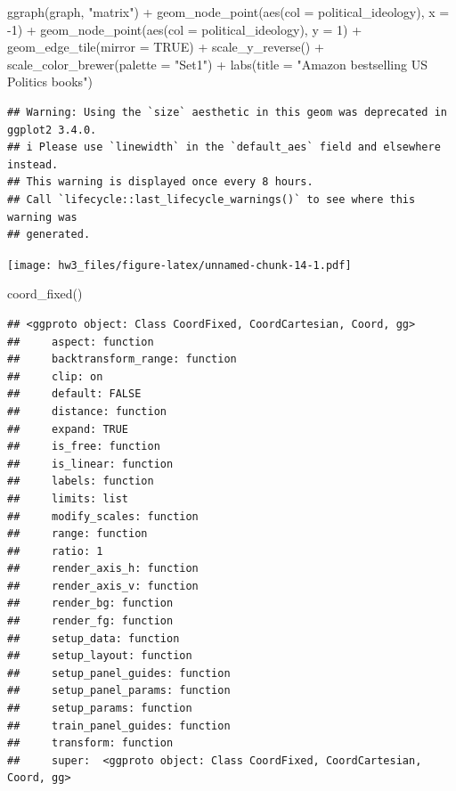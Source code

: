 \documentclass[
]{article}
\newenvironment{Shaded}{\begin{snugshade}}{\end{snugshade}}
\newcommand{\AttributeTok}[1]{\textcolor[rgb]{0.77,0.63,0.00}{#1}}
\newcommand{\ConstantTok}[1]{\textcolor[rgb]{0.00,0.00,0.00}{#1}}
\newcommand{\DecValTok}[1]{\textcolor[rgb]{0.00,0.00,0.81}{#1}}
\newcommand{\FunctionTok}[1]{\textcolor[rgb]{0.00,0.00,0.00}{#1}}
\newcommand{\NormalTok}[1]{#1}
\newcommand{\SpecialCharTok}[1]{\textcolor[rgb]{0.00,0.00,0.00}{#1}}
\newcommand{\StringTok}[1]{\textcolor[rgb]{0.31,0.60,0.02}{#1}}
\begin{document}
\begin{Shaded}
\begin{Highlighting}[]
\FunctionTok{ggraph}\NormalTok{(graph, }\StringTok{"matrix"}\NormalTok{) }\SpecialCharTok{+}
  \FunctionTok{geom\_node\_point}\NormalTok{(}\FunctionTok{aes}\NormalTok{(}\AttributeTok{col =}\NormalTok{ political\_ideology), }\AttributeTok{x =} \SpecialCharTok{{-}}\DecValTok{1}\NormalTok{) }\SpecialCharTok{+}
  \FunctionTok{geom\_node\_point}\NormalTok{(}\FunctionTok{aes}\NormalTok{(}\AttributeTok{col =}\NormalTok{ political\_ideology), }\AttributeTok{y =} \DecValTok{1}\NormalTok{) }\SpecialCharTok{+}
  \FunctionTok{geom\_edge\_tile}\NormalTok{(}\AttributeTok{mirror =} \ConstantTok{TRUE}\NormalTok{) }\SpecialCharTok{+}
  \FunctionTok{scale\_y\_reverse}\NormalTok{() }\SpecialCharTok{+}
  \FunctionTok{scale\_color\_brewer}\NormalTok{(}\AttributeTok{palette =} \StringTok{"Set1"}\NormalTok{) }\SpecialCharTok{+}
  \FunctionTok{labs}\NormalTok{(}\AttributeTok{title =} \StringTok{"Amazon bestselling US Politics books"}\NormalTok{)}
\end{Highlighting}
\end{Shaded}

\begin{verbatim}
## Warning: Using the `size` aesthetic in this geom was deprecated in ggplot2 3.4.0.
## i Please use `linewidth` in the `default_aes` field and elsewhere instead.
## This warning is displayed once every 8 hours.
## Call `lifecycle::last_lifecycle_warnings()` to see where this warning was
## generated.
\end{verbatim}

\texttt{[image: hw3\_files/figure-latex/unnamed-chunk-14-1.pdf]}

\begin{Shaded}
\begin{Highlighting}[]
  \FunctionTok{coord\_fixed}\NormalTok{()}
\end{Highlighting}
\end{Shaded}

\begin{verbatim}
## <ggproto object: Class CoordFixed, CoordCartesian, Coord, gg>
##     aspect: function
##     backtransform_range: function
##     clip: on
##     default: FALSE
##     distance: function
##     expand: TRUE
##     is_free: function
##     is_linear: function
##     labels: function
##     limits: list
##     modify_scales: function
##     range: function
##     ratio: 1
##     render_axis_h: function
##     render_axis_v: function
##     render_bg: function
##     render_fg: function
##     setup_data: function
##     setup_layout: function
##     setup_panel_guides: function
##     setup_panel_params: function
##     setup_params: function
##     train_panel_guides: function
##     transform: function
##     super:  <ggproto object: Class CoordFixed, CoordCartesian, Coord, gg>
\end{verbatim}
\end{document}
